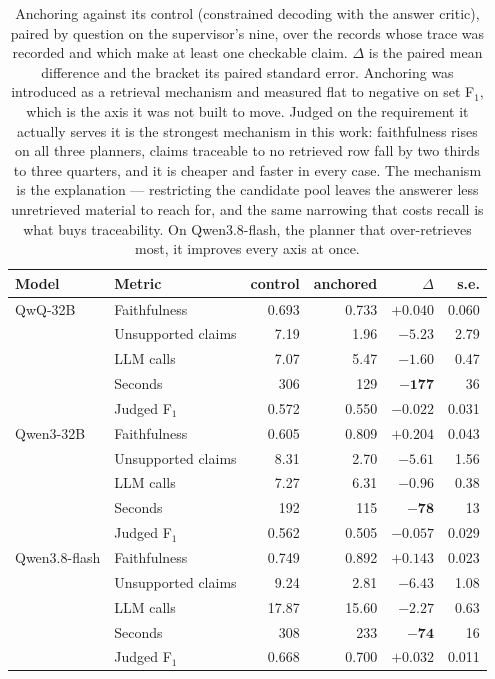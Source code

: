 
\begin{table}[htbp]
\centering
\small
\begin{tabular}{llrrrr}
\toprule
Model & Metric & control & anchored & $\Delta$ & s.e. \\
\midrule
QwQ-32B
 & Faithfulness        & 0.693 & 0.733 & $+0.040$ & 0.060 \\
 & Unsupported claims  &  7.19 &  1.96 & $\mathbf{-5.23}$ & 2.79 \\
 & LLM calls           &  7.07 &  5.47 & $-1.60$ & 0.47 \\
 & Seconds             &   306 &   129 & $\mathbf{-177}$ & 36 \\
 & Judged F$_1$        & 0.572 & 0.550 & $-0.022$ & 0.031 \\
\midrule
Qwen3-32B
 & Faithfulness        & 0.605 & 0.809 & $\mathbf{+0.204}$ & 0.043 \\
 & Unsupported claims  &  8.31 &  2.70 & $\mathbf{-5.61}$ & 1.56 \\
 & LLM calls           &  7.27 &  6.31 & $-0.96$ & 0.38 \\
 & Seconds             &   192 &   115 & $\mathbf{-78}$ & 13 \\
 & Judged F$_1$        & 0.562 & 0.505 & $-0.057$ & 0.029 \\
\midrule
Qwen3.8-flash
 & Faithfulness        & 0.749 & 0.892 & $\mathbf{+0.143}$ & 0.023 \\
 & Unsupported claims  &  9.24 &  2.81 & $\mathbf{-6.43}$ & 1.08 \\
 & LLM calls           & 17.87 & 15.60 & $-2.27$ & 0.63 \\
 & Seconds             &   308 &   233 & $\mathbf{-74}$ & 16 \\
 & Judged F$_1$        & 0.668 & 0.700 & $+0.032$ & 0.011 \\
\bottomrule
\end{tabular}
\caption[Anchoring, scored on provenance and cost]{Anchoring against its control
(constrained decoding with the answer critic), paired by question on the
supervisor's nine, over the records whose trace was recorded and which make at
least one checkable claim. $\Delta$ is the paired mean difference and the bracket
its paired standard error. Anchoring was introduced as a retrieval mechanism and
measured flat to negative on set F$_1$, which is the axis it was not built to
move. Judged on the requirement it actually serves it is the strongest mechanism
in this work: faithfulness rises on all three planners, claims traceable to no
retrieved row fall by two thirds to three quarters, and it is cheaper and faster
in every case. The mechanism is the explanation --- restricting the candidate
pool leaves the answerer less unretrieved material to reach for, and the same
narrowing that costs recall is what buys traceability. On Qwen3.8-flash, the
planner that over-retrieves most, it improves every axis at once.}
\label{tab:anchor-provenance}
\end{table}
